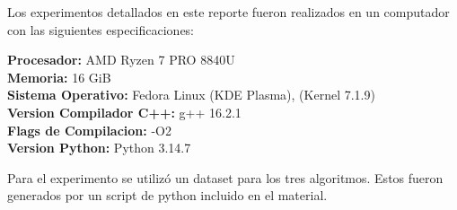 Los experimentos detallados en este reporte fueron realizados en un computador con las siguientes especificaciones:

\noindent\textbf{Procesador:} AMD Ryzen 7 PRO 8840U\\
\textbf{Memoria:} 16 GiB\\
\textbf{Sistema Operativo:} Fedora Linux (KDE Plasma), (Kernel 7.1.9)\\
\textbf{Version Compilador C++:} g++ 16.2.1\\
\textbf{Flags de Compilacion:} -O2\\
\textbf{Version Python:} Python 3.14.7

Para el experimento se utilizó un dataset para los tres algoritmos. Estos fueron generados por un script de python incluido en el material.
